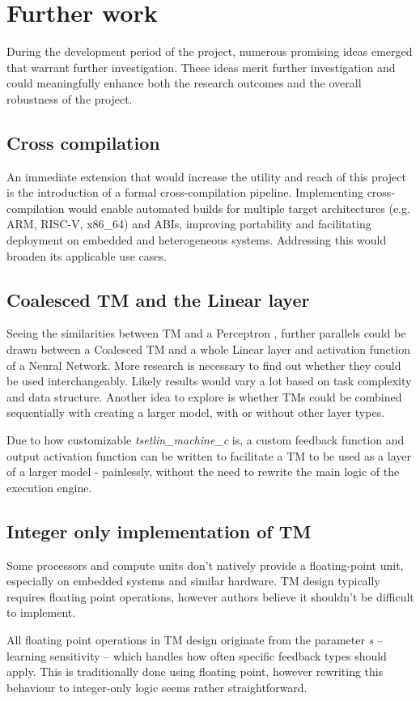 \documentclass[english]{aghengthesis} %
\newcommand{\listofalgorithmes}{\tocfile{\listalgorithmcfname}{loa}}
\renewcommand\lstlistlistingname{\LangListOfListings}
\renewcommand{\lstlistoflistings}{\begingroup
\tocfile{\lstlistlistingname}{lol}
\endgroup}
\newcommand*{\LibraryName}{\emph{tsetlin\_machine\_c }}
\begin{document}
\section{Further work}
During the development period of the project, numerous promising ideas emerged that warrant further investigation. These ideas merit further investigation and could meaningfully enhance both the research outcomes and the overall robustness of the project.

\subsection{Cross compilation}
An immediate extension that would increase the utility and reach of this project is the introduction of a formal cross-compilation pipeline. Implementing cross-compilation would enable automated builds for multiple target architectures (e.g. ARM, RISC-V, x86\_64) and ABIs, improving portability and facilitating deployment on embedded and heterogeneous systems. Addressing this would broaden its applicable use cases.

\subsection{Coalesced TM and the Linear layer}
Seeing the similarities between TM and a Perceptron \cite{sharma2022equivalenceweightedtsetlinmachine}, further parallels could be drawn between a Coalesced TM and a whole Linear layer and activation function of a Neural Network. More research is necessary to find out whether they could be used interchangeably. Likely results would vary a lot based on task complexity and data structure. Another idea to explore is whether TMs could be combined sequentially with creating a larger model, with or without other layer types.
\par Due to how customizable \LibraryName is, a custom feedback function and output activation function can be written to facilitate a TM to be used as a layer of a larger model - painlessly, without the need to rewrite the main logic of the execution engine.

\subsection{Integer only implementation of TM}
Some processors and compute units don't natively provide a floating-point unit, especially on embedded systems and similar hardware. TM design typically requires floating point operations, however authors believe it shouldn't be difficult to implement.
\par All floating point operations in TM design originate from the parameter \textit{s} -- learning sensitivity -- which handles how often specific feedback types should apply. This is traditionally done using floating point, however rewriting this behaviour to integer-only logic seems rather straightforward.


\printbibliography

\end{document}
